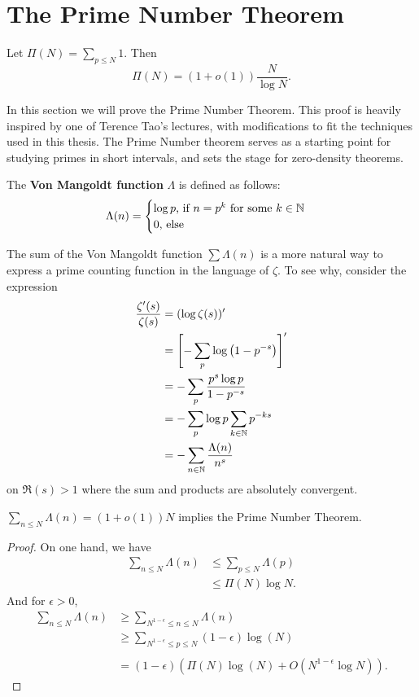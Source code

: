 \section{The Prime Number Theorem}

\begin{theorem}
    Let $\Pi(N)=\sum_{p\leq N} 1$. Then \[
        \Pi(N) = (1+o(1))\frac{N}{\log N}.
    \]
\end{theorem}

In this section we will prove the Prime Number Theorem. This proof is heavily inspired by one of Terence Tao's lectures, with modifications to fit the techniques used in this thesis.
The Prime Number theorem serves as a starting point for
studying primes in short intervals, and sets the stage for zero-density theorems.
\begin{definition}
    The \textbf{Von Mangoldt function} $\Lambda$ is defined as follows:
    \[
        \Lambda(n) = \begin{cases}
            \log p \textrm{, if $n = p^k$ for some $k\in\mathbb{N}$}\\
            0 \textrm{, else}
        \end{cases}
    \]
\end{definition}
The sum of the Von Mangoldt function $\sum\Lambda (n)$ is a more natural way to express
a prime counting function in the language of $\zeta$. To see why, consider the expression
\begin{align*}
    \frac{\zeta '(s)}{\zeta(s)} &= (\log\zeta(s))'\\
    &= \left[ -\sum_{p} \log\left(1-p^{-s}\right)\right]^{\prime}\\
    &= - \sum_{p} \frac{p^s \log p }{1-p^{-s}}\\
    &= -\sum_{p} \log p \sum_{k\in\mathbb{N}} p^{-ks}\\
    &= - \sum_{n\in\mathbb{N}} \frac{\Lambda(n)}{n^s}
\end{align*}
on $\Re(s)>1$ where the sum and products are absolutely convergent.
\begin{proposition}\label{mangoldtpnt}
    $\sum_{n\leq N} \Lambda(n) = (1+o(1))N$ implies the Prime Number Theorem.
\end{proposition}
\begin{proof}
    On one hand, we have \begin{align*}
        \sum_{n\leq N }\Lambda(n) &\leq \sum_{p \leq N }\Lambda(p)
        \\ &\leq \Pi(N){\log N}.
    \end{align*}
    And for $\epsilon>0$,
    \begin{align*}
        \sum_{n\leq N }\Lambda(n) &\geq \sum_{N^{1-\epsilon}\leq n\leq N }\Lambda(n)
        \\ &\geq \sum_{N^{1-\epsilon}\leq p \leq N }(1-\epsilon) \log(N)\\
        \\&= (1-\epsilon) (\Pi(N)\log(N) + O(N^{1-\epsilon}\log N)).
    \end{align*}
\end{proof}
